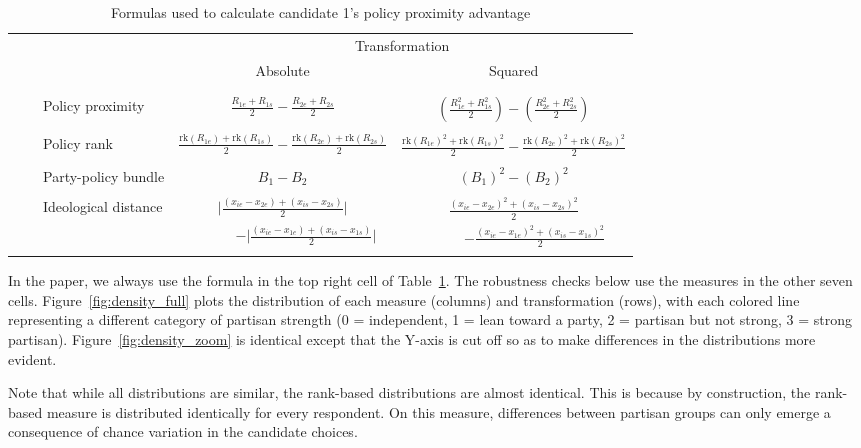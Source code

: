 \documentclass[12pt]{article}
\begin{document}
\begin{table}[h]
\renewcommand{\arraystretch}{1.5}
\centering
\caption{Formulas used to calculate candidate 1's policy proximity advantage}
\vspace{2mm}
\label{tab:formulas}
\begin{tabular}{c l c c}
\hline
& & \multicolumn{2}{c}{Transformation} \\
\cline{3-4}
& & Absolute & Squared \\
\hline
\parbox[t]{2mm}{} & \\
&& \\[-8mm]
& ~~Policy proximity & $\frac{R_{1e} + R_{1s}}{2} - \frac{R_{2e} + R_{2s}}{2}$ & $(\frac{R_{1e}^2 + R_{1s}^2}{2}) - (\frac{R_{2e}^2 + R_{2s}^2}{2})$ \\
&&& \\[-4mm]
& ~~Policy rank & $\frac{\text{rk}(R_{1e}) + \text{rk}(R_{1s})}{2} - \frac{\text{rk}(R_{2e}) + \text{rk}(R_{2s})}{2}$ & $\frac{\text{rk}(R_{1e})^2 + \text{rk}(R_{1s})^2}{2} - \frac{\text{rk}(R_{2e})^2 + \text{rk}(R_{2s})^2}{2}$ \\
&&& \\[-4mm]
& ~~Party-policy bundle & $B_1 - B_2$ & $(B_1)^2 - (B_2)^2$\\
&&& \\[-4mm]
& ~~Ideological distance & $ \vert\frac{(x_{ie} - x_{2e}) + (x_{is} - x_{2s})}{2}\vert$ & $\frac{(x_{ie} - x_{2e})^2 + (x_{is} - x_{2s})^2}{2}$\\[-1mm]
& & ~~~~~~ $-\vert\frac{(x_{ie} - x_{1e}) + (x_{is} - x_{1s})}{2}\vert$ & ~~~~~~$-\frac{(x_{ie} - x_{1e})^2 + (x_{is} - x_{1s})^2}{2}$ \\
&&& \\[-4mm]
\hline
\end{tabular}
\end{table}

In the paper, we always use the formula in the top right cell of Table~\ref{tab:formulas}. The robustness checks below use the measures in the other seven cells. Figure~\ref{fig:density_full} plots the distribution of each measure (columns) and transformation (rows), with each colored line representing a different category of partisan strength (0 = independent, 1 = lean toward a party, 2 = partisan but not strong, 3 = strong partisan). Figure~\ref{fig:density_zoom} is identical except that the Y-axis is cut off so as to make differences in the distributions more evident. 

Note that while all distributions are similar, the rank-based distributions are almost identical. This is because by construction, the rank-based measure is distributed identically for every respondent. On this measure, differences between partisan groups can only emerge a consequence of chance variation in the candidate choices.
\end{document}
